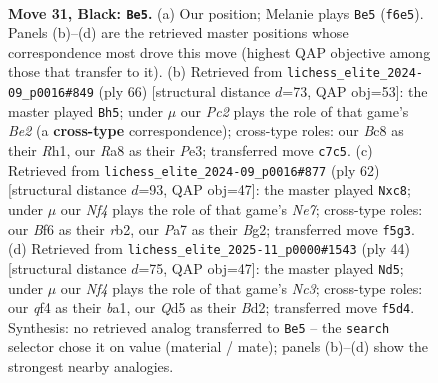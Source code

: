 \documentclass[11pt]{article}
\begin{document}
\begin{figure}[p]
\label{fig:thought-m59}
\end{figure}

\clearpage

\begin{figure}[p]\centering
\begin{subfigure}{0.46\textwidth}\centering
\resizebox{\linewidth}{!}{%
\newchessgame
\chessboard[
  setfen={r1b5/ppp2ppk/5b1p/3q1n2/B4Q2/5P1P/PP4P1/R1B4K b - - 3 31},
  showmover=false,
  pgfstyle=straightmove, color=movearrow, markmove={f6-e5}
]}
\caption{}
\end{subfigure}\hfill
\begin{subfigure}{0.46\textwidth}\centering
\resizebox{\linewidth}{!}{%
\newchessgame
\chessboard[
  setfen={6k1/4brp1/3p3p/n4b2/p2B3P/P3P1Q1/1PqNB1P1/K6R w - - 9 34},
  showmover=false,
  pgfstyle=straightmove, color=movearrow, markmove={e2-h5}
]}
\caption{}
\end{subfigure}
\\[4pt]
\begin{subfigure}{0.46\textwidth}\centering
\resizebox{\linewidth}{!}{%
\newchessgame
\chessboard[
  setfen={2b1q2k/4Npbp/1pPQ2p1/8/3p4/6P1/1r3PBP/2R3K1 w - - 2 32},
  showmover=false,
  pgfstyle=straightmove, color=movearrow, markmove={e7-c8}
]}
\caption{}
\end{subfigure}\hfill
\begin{subfigure}{0.46\textwidth}\centering
\resizebox{\linewidth}{!}{%
\newchessgame
\chessboard[
  setfen={4r1k1/5ppp/p1P3b1/5q2/1p1P4/1BN2Q1P/P2B1PP1/b5K1 w - - 0 23},
  showmover=false,
  pgfstyle=straightmove, color=movearrow, markmove={c3-d5}
]}
\caption{}
\end{subfigure}
\caption{\textbf{Move 31, Black: \texttt{Be5}.} (a) Our position; Melanie plays \texttt{Be5} (\texttt{f6e5}). Panels (b)--(d) are the retrieved master positions whose correspondence most drove this move (highest QAP objective among those that transfer to it). (b) Retrieved from \texttt{lichess\_elite\_2024-09\_p0016\#849} (ply 66) [structural distance $d$=73, QAP obj=53]: the master played \texttt{Bh5}; under $\mu$ our \emph{Pc2} plays the role of that game's \emph{Be2} (a \textbf{cross-type} correspondence); cross-type roles: our \emph{B}c8 as their \emph{R}h1, our \emph{R}a8 as their \emph{P}e3; transferred move \texttt{c7c5}. (c) Retrieved from \texttt{lichess\_elite\_2024-09\_p0016\#877} (ply 62) [structural distance $d$=93, QAP obj=47]: the master played \texttt{Nxc8}; under $\mu$ our \emph{Nf4} plays the role of that game's \emph{Ne7}; cross-type roles: our \emph{B}f6 as their \emph{r}b2, our \emph{P}a7 as their \emph{B}g2; transferred move \texttt{f5g3}. (d) Retrieved from \texttt{lichess\_elite\_2025-11\_p0000\#1543} (ply 44) [structural distance $d$=75, QAP obj=47]: the master played \texttt{Nd5}; under $\mu$ our \emph{Nf4} plays the role of that game's \emph{Nc3}; cross-type roles: our \emph{q}f4 as their \emph{b}a1, our \emph{Q}d5 as their \emph{B}d2; transferred move \texttt{f5d4}. Synthesis: no retrieved analog transferred to \texttt{Be5} -- the \texttt{search} selector chose it on value (material / mate); panels (b)--(d) show the strongest nearby analogies.}
\label{fig:thought-m61}
\end{figure}
\end{document}
